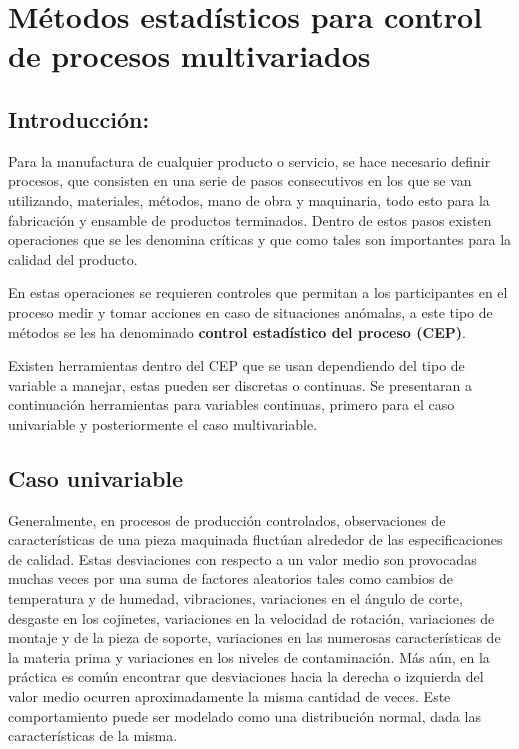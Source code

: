 \documentclass[english]{report}
\begin{document}
\chapter{Métodos estadísticos para control de procesos multivariados}


\section{Introducción:}

Para la manufactura de cualquier producto o servicio, se hace necesario
definir procesos, que consisten en una serie de pasos
consecutivos en los que se van utilizando, materiales, métodos,
mano de obra y maquinaria, todo esto para la fabricación y ensamble de productos
terminados. Dentro de estos pasos existen operaciones que se les denomina
críticas y que como tales son importantes para la calidad del producto.

En estas operaciones se requieren controles que permitan
a los participantes en el proceso medir y tomar acciones en caso de
situaciones anómalas, a este tipo de métodos se les ha denominado
\textbf{control estadístico del proceso (CEP)}.

Existen herramientas dentro del CEP que se usan dependiendo del tipo
de variable a manejar, estas pueden ser discretas o continuas. Se
presentaran a continuación herramientas para variables continuas,
primero para el caso univariable y posteriormente el caso multivariable.


\section{Caso univariable}

Generalmente, en procesos de producción controlados, observaciones
de características de una pieza maquinada fluctúan alrededor de las
especificaciones de calidad. Estas desviaciones con respecto a un
valor medio son provocadas muchas veces por una suma de factores aleatorios
tales como cambios de temperatura y de humedad, vibraciones, variaciones
en el ángulo de corte, desgaste en los cojinetes, variaciones en la
velocidad de rotación, variaciones de montaje y de la pieza de soporte,
variaciones en las numerosas características de la materia prima y
variaciones en los niveles de contaminación. Más aún, en la práctica
es común encontrar que desviaciones hacia la derecha o izquierda del
valor medio ocurren aproximadamente la misma cantidad de veces. Este
comportamiento puede ser modelado como una distribución normal, dada
las características de la misma.
\end{document}
